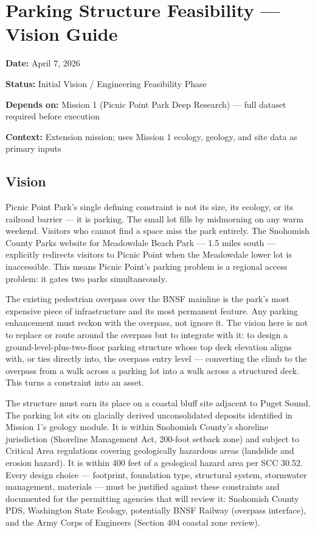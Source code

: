 \documentclass[11pt,letterpaper]{article}
\newcommand{\metafield}[2]{\textbf{\sffamily #1} #2\par}
\begin{document}
\section{Parking Structure Feasibility --- Vision Guide}

\metafield{Date:}{April 7, 2026}
\metafield{Status:}{Initial Vision / Engineering Feasibility Phase}
\metafield{Depends on:}{Mission 1 (Picnic Point Park Deep Research) --- full dataset required before execution}
\metafield{Context:}{Extension mission; uses Mission 1 ecology, geology, and site data as primary inputs}

\subsection{Vision}

Picnic Point Park's single defining constraint is not its size, its ecology, or its railroad barrier --- it is parking. The small lot fills by midmorning on any warm weekend. Visitors who cannot find a space miss the park entirely. The Snohomish County Parks website for Meadowdale Beach Park --- 1.5 miles south --- explicitly redirects visitors to Picnic Point when the Meadowdale lower lot is inaccessible. This means Picnic Point's parking problem is a regional access problem: it gates two parks simultaneously.

The existing pedestrian overpass over the BNSF mainline is the park's most expensive piece of infrastructure and its most permanent feature. Any parking enhancement must reckon with the overpass, not ignore it. The vision here is not to replace or route around the overpass but to integrate with it: to design a ground-level-plus-two-floor parking structure whose top deck elevation aligns with, or ties directly into, the overpass entry level --- converting the climb to the overpass from a walk across a parking lot into a walk across a structured deck. This turns a constraint into an asset.

The structure must earn its place on a coastal bluff site adjacent to Puget Sound. The parking lot sits on glacially derived unconsolidated deposits identified in Mission 1's geology module. It is within Snohomish County's shoreline jurisdiction (Shoreline Management Act, 200-foot setback zone) and subject to Critical Area regulations covering geologically hazardous areas (landslide and erosion hazard). It is within 400 feet of a geological hazard area per SCC 30.52. Every design choice --- footprint, foundation type, structural system, stormwater management, materials --- must be justified against these constraints and documented for the permitting agencies that will review it: Snohomish County PDS, Washington State Ecology, potentially BNSF Railway (overpass interface), and the Army Corps of Engineers (Section 404 coastal zone review).
\end{document}

